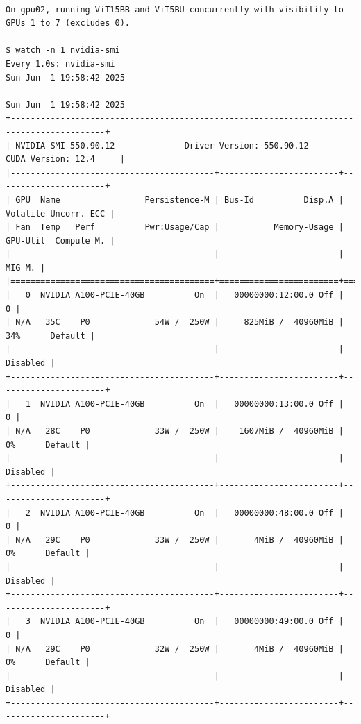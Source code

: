 \begin{verbatim}

On gpu02, running ViT15BB and ViT5BU concurrently with visibility to GPUs 1 to 7 (excludes 0).

$ watch -n 1 nvidia-smi
Every 1.0s: nvidia-smi                                                                                                                                                                    Sun Jun  1 19:58:42 2025

Sun Jun  1 19:58:42 2025
+-----------------------------------------------------------------------------------------+
| NVIDIA-SMI 550.90.12              Driver Version: 550.90.12      CUDA Version: 12.4     |
|-----------------------------------------+------------------------+----------------------+
| GPU  Name                 Persistence-M | Bus-Id          Disp.A | Volatile Uncorr. ECC |
| Fan  Temp   Perf          Pwr:Usage/Cap |           Memory-Usage | GPU-Util  Compute M. |
|                                         |                        |               MIG M. |
|=========================================+========================+======================|
|   0  NVIDIA A100-PCIE-40GB          On  |   00000000:12:00.0 Off |                    0 |
| N/A   35C    P0             54W /  250W |     825MiB /  40960MiB |     34%      Default |
|                                         |                        |             Disabled |
+-----------------------------------------+------------------------+----------------------+
|   1  NVIDIA A100-PCIE-40GB          On  |   00000000:13:00.0 Off |                    0 |
| N/A   28C    P0             33W /  250W |    1607MiB /  40960MiB |      0%      Default |
|                                         |                        |             Disabled |
+-----------------------------------------+------------------------+----------------------+
|   2  NVIDIA A100-PCIE-40GB          On  |   00000000:48:00.0 Off |                    0 |
| N/A   29C    P0             33W /  250W |       4MiB /  40960MiB |      0%      Default |
|                                         |                        |             Disabled |
+-----------------------------------------+------------------------+----------------------+
|   3  NVIDIA A100-PCIE-40GB          On  |   00000000:49:00.0 Off |                    0 |
| N/A   29C    P0             32W /  250W |       4MiB /  40960MiB |      0%      Default |
|                                         |                        |             Disabled |
+-----------------------------------------+------------------------+----------------------+

\end{verbatim}

